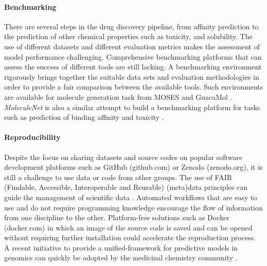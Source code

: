 \documentclass[review]{elsarticle}
\begin{document}
\paragraph{Benchmarking} There are several steps in the drug discovery pipeline, from affinity prediction to the prediction of other chemical properties such as toxicity, and solubility. The use of different datasets and different evaluation metrics makes the assessment of model performance challenging.  Comprehensive benchmarking platforms that can assess the success of different tools are still lacking. A benchmarking environment rigorously brings together the suitable data sets and evaluation methodologies in order to provide a fair comparison between the available tools. Such environments are available for molecule generation task from MOSES \cite{polykovskiy2018molecular} and GuacaMol \cite{brown2019guacamol}. \textit{MoleculeNet} is also a similar attempt to build a benchmarking platform for tasks such as prediction of binding affinity and toxicity \cite{wu2018moleculenet}.


\paragraph{Reproducibility} Despite the focus on sharing datasets and source codes on popular software development platforms such as GitHub (github.com) or Zenodo (zenodo.org), it is still a challenge to use data or code from other groups. The use of FAIR (Findable, Accessible, Interoperable and Reusable) (meta)data principles can guide the management of scientific data \cite{wilkinson2016fair}. Automated workflows that are easy to use and do not require programming knowledge encourage the flow of information from one discipline to the other. Platform-free solutions such as Docker (docker.com) in which an image of the source code is saved and can be opened without requiring further installation could accelerate the reproduction process. A recent initiative to provide a unified-framework for predictive models in genomics can quickly be adopted by the medicinal chemistry community \cite{avsec2019kipoi}. 
\end{document}
